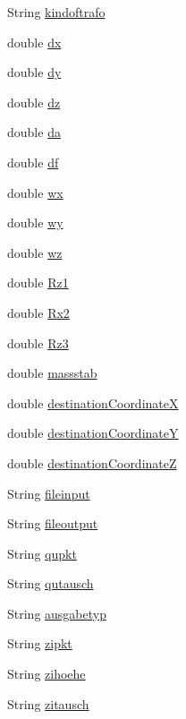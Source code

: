 \begin{DoxyCompactItemize}
String \hyperlink{classparams_1_1_control_parms_afcfdabbc39158e0ae25e47d76a6dc2a4}{kindoftrafo}
\item 
double \hyperlink{classparams_1_1_control_parms_ac33290885ff9f6559cb4864a5fbaedb0}{dx}
\item 
double \hyperlink{classparams_1_1_control_parms_ab6b652d7f1f9ac1dba4a12c2cf2696cb}{dy}
\item 
double \hyperlink{classparams_1_1_control_parms_aa3bc4f90d701204615fc84404b5c47f0}{dz}
\item 
double \hyperlink{classparams_1_1_control_parms_af7874df2feb2be8ca0f3a7f1250ef7fd}{da}
\item 
double \hyperlink{classparams_1_1_control_parms_a3dfb56045add56099f7321b470f5d9fe}{df}
\item 
double \hyperlink{classparams_1_1_control_parms_a08c3a014edb82ee19a2b046a07efbac5}{wx}
\item 
double \hyperlink{classparams_1_1_control_parms_a35defe66635bc8e2aaa05c146dc5e4ac}{wy}
\item 
double \hyperlink{classparams_1_1_control_parms_ad948128a938b351f23b1d7aee4ae1cb3}{wz}
\item 
double \hyperlink{classparams_1_1_control_parms_a0501dbc13102eff28a1e15e005e73c26}{Rz1}
\item 
double \hyperlink{classparams_1_1_control_parms_af114ca71c4fdd82a3f056807591efdb0}{Rx2}
\item 
double \hyperlink{classparams_1_1_control_parms_a60fdffbd1fadf6b1a7a0372939337131}{Rz3}
\item 
double \hyperlink{classparams_1_1_control_parms_a7d7e220c8bacb270d2f0760b4230df04}{massstab}
\item 
double \hyperlink{classparams_1_1_control_parms_aeaf9b43a90b6126041788042b28951be}{destination\+CoordinateX}
\item 
double \hyperlink{classparams_1_1_control_parms_a90bb6214dd6ee9d4f02aa7cf58d915bb}{destination\+CoordinateY}
\item 
double \hyperlink{classparams_1_1_control_parms_a08120c4eed68ad7702c1916abaaa16db}{destination\+CoordinateZ}
\item 
String \hyperlink{classparams_1_1_control_parms_a8f7f249d73a5315f42f96ad5e844714e}{fileinput}
\item 
String \hyperlink{classparams_1_1_control_parms_a46c822bd308f3cf5593519a9b1421a07}{fileoutput}
\item 
String \hyperlink{classparams_1_1_control_parms_a289a0ed91250fd5f28210158775de95c}{qupkt}
\item 
String \hyperlink{classparams_1_1_control_parms_a8ede5bb2ec22052831dcac27853ef668}{qutausch}
\item 
String \hyperlink{classparams_1_1_control_parms_a614f382326dedabe279d8c79abf6b507}{ausgabetyp}
\item 
String \hyperlink{classparams_1_1_control_parms_a5796bbd6b3b407130074d89b85c183d6}{zipkt}
\item 
String \hyperlink{classparams_1_1_control_parms_a780c529e507f496ccb69f6b9b3ddce62}{zihoehe}
\item 
String \hyperlink{classparams_1_1_control_parms_afeb9c826d60a837625db477d1e836880}{zitausch}
\end{DoxyCompactItemize}
